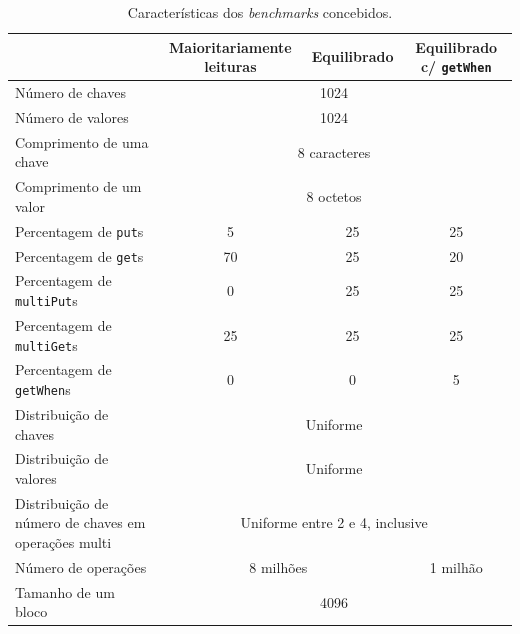 \documentclass[11pt, a4paper]{article}
\begin{document}
\begin{table}[H]
    \begin{center}
        \begin{tabular}{|m{5cm}|c|c|c|}
            \hline & Maioritariamente leituras & Equilibrado & Equilibrado c/ \texttt{getWhen} \\

            \hline Número de chaves         & \multicolumn{3}{c|}{1024}         \\
            \hline Número de valores        & \multicolumn{3}{c|}{1024}         \\
            \hline Comprimento de uma chave & \multicolumn{3}{c|}{8 caracteres} \\
            \hline Comprimento de um valor  & \multicolumn{3}{c|}{8 octetos}    \\

            \hline Percentagem de \texttt{put}s      & 5  & 25 & 25 \\
            \hline Percentagem de \texttt{get}s      & 70 & 25 & 20 \\
            \hline Percentagem de \texttt{multiPut}s & 0  & 25 & 25 \\
            \hline Percentagem de \texttt{multiGet}s & 25 & 25 & 25 \\
            \hline Percentagem de \texttt{getWhen}s  & 0  & 0  & 5  \\

            \hline Distribuição de chaves  & \multicolumn{3}{c|}{Uniforme} \\
            \hline Distribuição de valores & \multicolumn{3}{c|}{Uniforme} \\
            \hline Distribuição de número de chaves em operações multi &
                \multicolumn{3}{c|}{Uniforme entre 2 e 4, inclusive} \\

            \hline Número de operações & \multicolumn{2}{c|}{8 milhões} & 1 milhão\footnotemark \\
            \hline Tamanho de um bloco & \multicolumn{3}{c|}{4096} \\
            \hline
        \end{tabular}
    \end{center}

    \caption{Características dos \emph{benchmarks} concebidos.}
\end{table}

\end{document}
